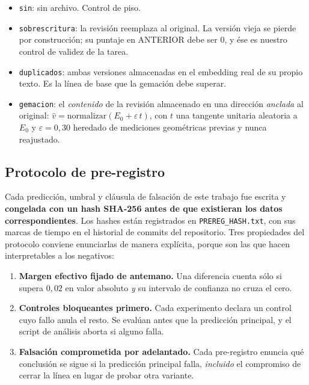 \documentclass[11pt,a4paper]{article}
\begin{document}
\begin{itemize}
\item \texttt{sin}: sin archivo. Control de piso.
\item \texttt{sobrescritura}: la revisión reemplaza al original. La versión vieja se pierde por
      construcción; su puntaje en ANTERIOR debe ser $0$, y ése es nuestro control de validez de la
      tarea.
\item \texttt{duplicados}: ambas versiones almacenadas en el embedding real de su propio texto. Es la
      línea de base que la gemación debe superar.
\item \texttt{gemacion}: el \emph{contenido} de la revisión almacenado en una dirección
      \emph{anclada} al original: $\hat{v} = \mathrm{normalizar}(E_0 + \varepsilon\, t)$, con $t$ una
      tangente unitaria aleatoria a $E_0$ y $\varepsilon = 0{,}30$ heredado de mediciones geométricas
      previas y nunca reajustado.
\end{itemize}

\subsection{Protocolo de pre-registro}

Cada predicción, umbral y cláusula de falsación de este trabajo fue escrita y \textbf{congelada con
un hash SHA-256 antes de que existieran los datos correspondientes}. Los hashes están registrados en
\texttt{PREREG\_HASH.txt}, con sus marcas de tiempo en el historial de commits del repositorio. Tres
propiedades del protocolo conviene enunciarlas de manera explícita, porque son las que hacen
interpretables a los negativos:

\begin{enumerate}
\item \textbf{Margen efectivo fijado de antemano.} Una diferencia cuenta sólo si supera $0{,}02$ en
      valor absoluto \emph{y} su intervalo de confianza no cruza el cero.
\item \textbf{Controles bloqueantes primero.} Cada experimento declara un control cuyo fallo anula el
      resto. Se evalúan antes que la predicción principal, y el script de análisis aborta si alguno
      falla.
\item \textbf{Falsación comprometida por adelantado.} Cada pre-registro enuncia qué conclusión se
      sigue si la predicción principal falla, \emph{incluido} el compromiso de cerrar la línea en
      lugar de probar otra variante.
\end{enumerate}
\end{document}
